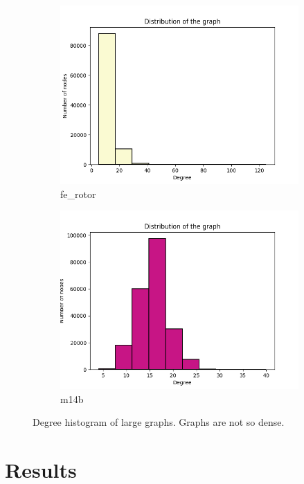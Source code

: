 \begin{figure}[h!]
\begin{subfigure}{.35\textwidth}
  \centering
  \includegraphics[width=\linewidth]{large_graphs/fe_rotor.png}  
  \caption{fe\_rotor}
  \label{fig:sub-third}
\end{subfigure}
\begin{subfigure}{.35\textwidth}
  \centering
  \includegraphics[width=\linewidth]{large_graphs/m14b.png}  
  \caption{m14b}
  \label{fig:sub-fourth}
\end{subfigure}
\caption{Degree histogram of large graphs. Graphs are not so dense.}
\label{fig:fig}
\end{figure}

\section{Results}

